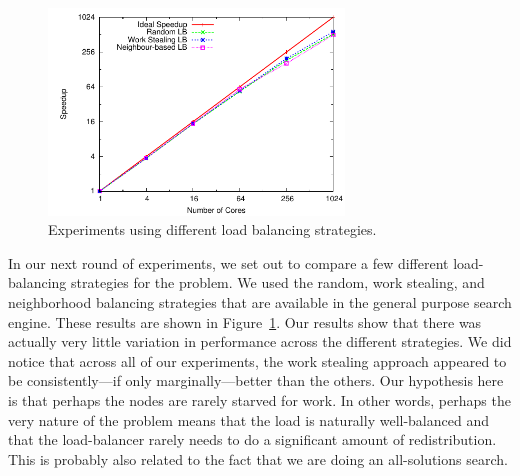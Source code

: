 \documentclass[11pt]{article}
\begin{document}
\begin{figure}[h]
\centering
\includegraphics[width=0.7\textwidth]{plots/3schemes.pdf}
\caption{Experiments using different load balancing strategies.}
\label{3schemes}
\end{figure}

In our next round of experiments, we set out to compare a few different load-balancing strategies for the problem.  We
used the random, work stealing, and neighborhood balancing strategies that are available in the general purpose search
engine.  These results are shown in Figure~\ref{3schemes}.  Our results show that there was actually very little
variation in performance across the different strategies.  We did notice that across all of our experiments, the work
stealing approach appeared to be consistently---if only marginally---better than the others.  Our hypothesis here is
that perhaps the nodes are rarely starved for work.  In other words, perhaps the very nature of the problem means that
the load is naturally well-balanced and that the load-balancer rarely needs to do a significant amount of
redistribution.  This is probably also related to the fact that we are doing an all-solutions search. 
\end{document}
